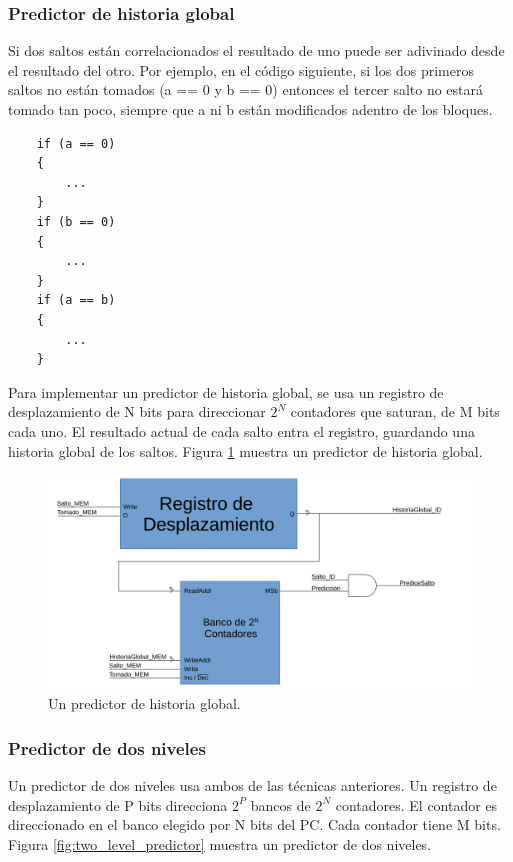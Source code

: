 \documentclass[a4paper]{article}
\begin{document}
\subsubsection{Predictor de historia global}

Si dos saltos están correlacionados el resultado de uno puede ser adivinado desde el resultado del otro. Por ejemplo, en el código siguiente, si los dos primeros saltos no están tomados (a == 0 y b == 0) entonces el tercer salto no estará tomado tan poco, siempre que a ni b están modificados adentro de los bloques.

\begin{verbatim}
    if (a == 0)
    {
        ...
    }
    if (b == 0)
    {
        ...
    }
    if (a == b)
    {
        ...
    }
\end{verbatim}

Para implementar un predictor de historia global, se usa un registro de desplazamiento de N bits para direccionar $2^N$ contadores que saturan, de M bits cada uno. El resultado actual de cada salto entra el registro, guardando una historia global de los saltos. Figura \ref{fig:global_history} muestra un predictor de historia global.

\begin{figure}[!htb]
\centering
\includegraphics[scale=0.4]{./img/global_history}
\caption{Un predictor de historia global.}
\label{fig:global_history}
\end{figure}

\subsubsection{Predictor de dos niveles}

Un predictor de dos niveles usa ambos de las técnicas anteriores. Un registro de desplazamiento de P bits direcciona $2^P$ bancos de $2^N$ contadores. El contador es direccionado en el banco elegido por N bits del PC. Cada contador tiene M bits. Figura \ref{fig:two_level_predictor} muestra un predictor de dos niveles.
\end{document}
